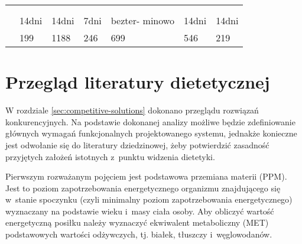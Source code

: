 \begin{minipage}{\textwidth}
\begin{table}[H]
\begin{tabular}{|P{.22\textwidth}|P{.09\textwidth}|P{.09\textwidth}|P{.09\textwidth}|P{.09\textwidth}|P{.09\textwidth}|P{.09\textwidth}|}
                                      &        &            &            &              &          &          \\ \hline
                                       &        &            &              &              &          &        \\ \hline
                   &        &            &            &              &          &        \\ \hline
                                                & 14dni                 & 14dni                     & 7dni                      & bezter- minowo            & 14dni                 & 14dni                 \\ \hline
                                           & 199                   & 1188                      & 246                       & 699                       & 546                   & 219                   \\ \hline
        \end{tabular}
    \end{table}
\end{minipage}

\section{Przegląd literatury dietetycznej}\label{sec:domain-literature}

W rozdziale \ref{sec:competitive-solutions} dokonano przeglądu rozwiązań konkurencyjnych.
Na podstawie dokonanej analizy możliwe będzie zdefiniowanie głównych wymagań funkcjonalnych projektowanego systemu,
jednakże konieczne jest odwołanie się do literatury dziedzinowej, żeby potwierdzić zasadność przyjętych założeń istotnych z~punktu widzenia dietetyki.

\par
Pierwszym rozważanym pojęciem jest podstawowa przemiana materii (PPM).
Jest to poziom zapotrzebowania energetycznego organizmu znajdującego się w~stanie spoczynku (czyli minimalny poziom zapotrzebowania energetycznego)
wyznaczany na podstawie wieku i~masy ciała osoby.
Aby obliczyć wartość energetyczną posiłku należy wyznaczyć ekwiwalent metaboliczny (MET) podstawowych wartości odżywczych,
tj. białek, tłuszczy i~węglowodanów\cite{book:dietetyka-zywienie-zdrowego-i-chorego-czlowieka}.


